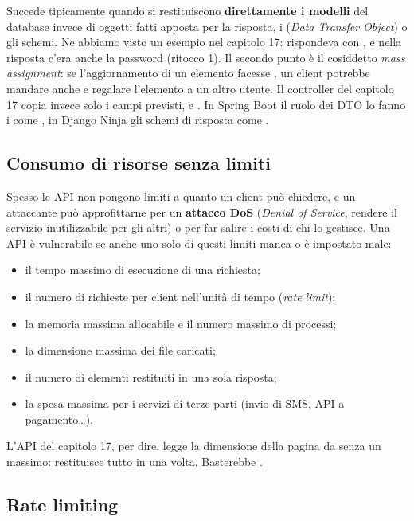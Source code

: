 Succede tipicamente quando si restituiscono \textbf{direttamente i modelli} del
database invece di oggetti fatti apposta per la risposta, i 
(\textit{Data Transfer Object}) o gli schemi. Ne abbiamo visto un esempio nel
capitolo 17:  rispondeva con , e nella
risposta c'era anche la password (ritocco 1). Il secondo punto è il cosiddetto
\textit{mass assignment}: se l'aggiornamento di un elemento facesse
, un client potrebbe mandare anche
 e regalare l'elemento a un altro utente. Il
controller del capitolo 17 copia invece solo i campi previsti,  e
. In Spring Boot il ruolo dei DTO lo fanno i  come
, in Django Ninja gli schemi di risposta come
.

\subsection{Consumo di risorse senza limiti}

Spesso le API non pongono limiti a quanto un client può chiedere, e un
attaccante può approfittarne per un \textbf{attacco DoS} (\textit{Denial of
Service}, rendere il servizio inutilizzabile per gli altri) o per far salire i
costi di chi lo gestisce. Una API è vulnerabile se anche uno solo di questi
limiti manca o è impostato male:

\begin{itemize}
  \item il tempo massimo di esecuzione di una richiesta;
  \item il numero di richieste per client nell'unità di tempo (\textit{rate
        limit});
  \item la memoria massima allocabile e il numero massimo di processi;
  \item la dimensione massima dei file caricati;
  \item il numero di elementi restituiti in una sola risposta;
  \item la spesa massima per i servizi di terze parti (invio di SMS, API a
        pagamento\ldots).
\end{itemize}

L'API del capitolo 17, per dire, legge la dimensione della pagina da
 senza un massimo:  restituisce tutto in una
volta. Basterebbe .

\subsection{Rate limiting}

